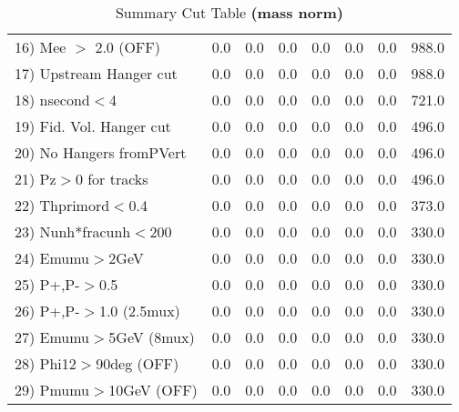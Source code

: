 \begin{table}[h!]
{{\begin{tabular}{||l||r|r|r|r|r||r||r||}
 16) Mee $>$ 2.0  (OFF)   &       0.0 &       0.0 &       0.0 &       0.0 &       0.0 &       0.0 &     988.0 \\
 17) Upstream Hanger cut  &       0.0 &       0.0 &       0.0 &       0.0 &       0.0 &       0.0 &     988.0 \\
 18) nsecond$<$4          &       0.0 &       0.0 &       0.0 &       0.0 &       0.0 &       0.0 &     721.0 \\
 19) Fid. Vol. Hanger cut &       0.0 &       0.0 &       0.0 &       0.0 &       0.0 &       0.0 &     496.0 \\
 20) No Hangers fromPVert &       0.0 &       0.0 &       0.0 &       0.0 &       0.0 &       0.0 &     496.0 \\
 21) Pz$>$0 for tracks    &       0.0 &       0.0 &       0.0 &       0.0 &       0.0 &       0.0 &     496.0 \\
 22) Thprimord$<$0.4      &       0.0 &       0.0 &       0.0 &       0.0 &       0.0 &       0.0 &     373.0 \\
 23) Nunh*fracunh$<$200   &       0.0 &       0.0 &       0.0 &       0.0 &       0.0 &       0.0 &     330.0 \\
 24) Emumu$>$2GeV         &       0.0 &       0.0 &       0.0 &       0.0 &       0.0 &       0.0 &     330.0 \\
 25) P+,P-$>$0.5          &       0.0 &       0.0 &       0.0 &       0.0 &       0.0 &       0.0 &     330.0 \\
 26) P+,P-$>$1.0 (2.5mux) &       0.0 &       0.0 &       0.0 &       0.0 &       0.0 &       0.0 &     330.0 \\
 27) Emumu$>$5GeV  (8mux) &       0.0 &       0.0 &       0.0 &       0.0 &       0.0 &       0.0 &     330.0 \\
 28) Phi12$>$90deg  (OFF) &       0.0 &       0.0 &       0.0 &       0.0 &       0.0 &       0.0 &     330.0 \\
 29) Pmumu$>$10GeV  (OFF) &       0.0 &       0.0 &       0.0 &       0.0 &       0.0 &       0.0 &     330.0 \\
 \hline
 \hline
 \end{tabular}
 \caption{Summary Cut Table \textbf{ (mass norm) }}
 \label{tab-sumcut}
 }}
 \end{table}
 \endinput
